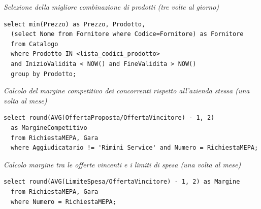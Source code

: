 \noindent\textit{Selezione della migliore combinazione di prodotti (tre volte al giorno)}
\begin{verbatim}
select min(Prezzo) as Prezzo, Prodotto,
  (select Nome from Fornitore where Codice=Fornitore) as Fornitore
  from Catalogo
  where Prodotto IN <lista_codici_prodotto>
  and InizioValidita < NOW() and FineValidita > NOW()
  group by Prodotto;
\end{verbatim}
\vspace{0.5cm}

\noindent{}
\newline\newline

\noindent\textit{Calcolo del margine competitivo dei concorrenti rispetto all’azienda stessa (una volta al mese)}
\begin{verbatim}
select round(AVG(OffertaProposta/OffertaVincitore) - 1, 2)
  as MargineCompetitivo
  from RichiestaMEPA, Gara
  where Aggiudicatario != 'Rimini Service' and Numero = RichiestaMEPA;
\end{verbatim}
\vspace{0.5cm}

\noindent{}
\newline\newline

\noindent\textit{Calcolo margine tra le offerte vincenti e i limiti di spesa (una volta al mese)}
\begin{verbatim}
select round(AVG(LimiteSpesa/OffertaVincitore) - 1, 2) as Margine
  from RichiestaMEPA, Gara
  where Numero = RichiestaMEPA;
\end{verbatim}
\vspace{0.5cm}

\noindent{}
\newline\newline

